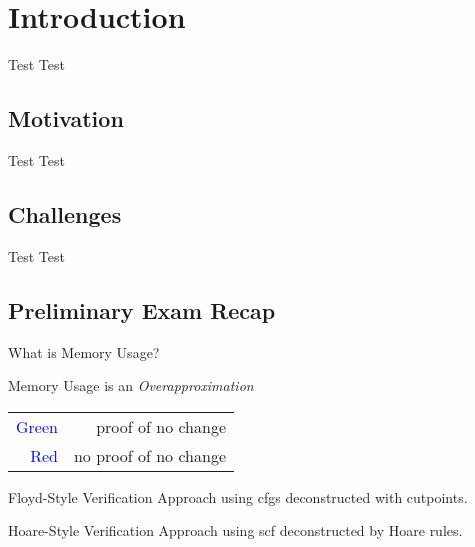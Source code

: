 \section{Introduction}
\begin{frame}{Test}
  Test
\end{frame}


\subsection{Motivation}
\begin{frame}{Test}
  Test
\end{frame}


\subsection{Challenges}
\begin{frame}{Test}
  Test
\end{frame}


\subsection{Preliminary Exam Recap}
\begin{frame}{What is Memory Usage?}
\end{frame}

\begin{frame}{Memory Usage is an \emph{Overapproximation}}
  \centering
  \vfill
  \begin{tabular}{rr}
    \textcolor{blue}{Green} & proof of no change \\
    \textcolor{blue}{Red} & no proof of no change
  \end{tabular}
\end{frame}

\begin{frame}{Floyd-Style Verification}
  Approach using \glspl{cfg} deconstructed with \alert{cutpoints}.
\end{frame}

\begin{frame}{Hoare-Style Verification}
  Approach using \gls{scf} deconstructed by \alert{Hoare rules}.
\end{frame}
